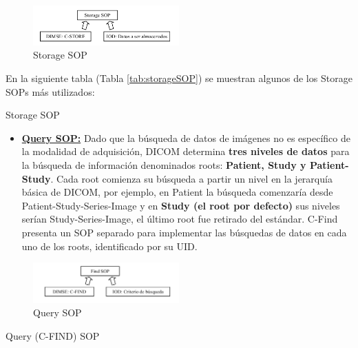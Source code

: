 \begin{figure}[!h]
\begin{center}
\includegraphics[width=0.5\textwidth]{images/storageSOP.png}
\caption{Storage SOP}
\label{fig:storageSOP}
\end{center}
\end{figure}

En la siguiente tabla (Tabla \ref{tab:storageSOP}) se muestran algunos de los Storage SOPs más utilizados:

\begin{table}[hp]
\centering{
\small
}
\caption{Storage SOP}
\label{tab:storageSOP}
\end{table}

\begin{itemize}
\item \textbf{\underline{Query SOP:}} Dado que la búsqueda de datos de imágenes no es específico de la modalidad de adquisición, DICOM determina \textbf{tres niveles de datos} para la búsqueda de información denominados roots: \textbf{Patient, Study y Patient-Study}. Cada root comienza su búsqueda a partir un nivel en la jerarquía básica de DICOM, por ejemplo, en Patient la búsqueda comenzaría desde Patient-Study-Series-Image y en \textbf{Study (el root por defecto)} sus niveles serían Study-Series-Image, el último root fue retirado del estándar. C-Find presenta un SOP separado para implementar las búsquedas de datos en cada uno de los roots, identificado por su UID.
\end{itemize}

\begin{figure}[!h]
\begin{center}
\includegraphics[width=0.5\textwidth]{images/querySOP.png}
\caption{Query SOP}
\label{fig:querySOP}
\end{center}
\end{figure}

\begin{table}[hp]
\centering{
\small
}
\caption{Query (C-FIND) SOP}
\label{tab:querySOP}
\end{table}


